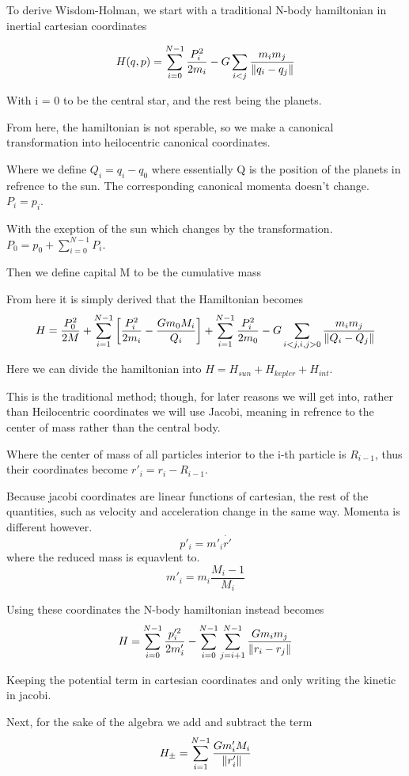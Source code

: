 To derive Wisdom-Holman, we start with a traditional N-body hamiltonian in inertial cartesian coordinates

\[
	H(q,p) = \sum_{i=0}^{N-1}\frac{P^2_i}
	{2m_i} - G \sum_{i<j} \frac{m_i m_j}{\norm{q_i - q_j}} \]

With i = 0 to be the central star, and the rest being the planets.

From here, the hamiltonian is not sperable, so we make a canonical transformation into heilocentric canonical coordinates.

Where we define $Q_i = q_i -q_0$ where essentially Q is the position of the planets in refrence to the sun. The corresponding canonical momenta doesn't change. $P_i=p_i$.

With the exeption of the sun which changes by the transformation. $P_0 = p_0 + \sum^{N-1}_{i=0} P_i$.

Then we define capital M to be the cumulative mass

From here it is simply derived that the Hamiltonian becomes
\[
	H = \frac{P_0^2}{2M} + \sum_{i=1}^{N-1} \left[\frac{P^2_i}{2m_i} - \frac{Gm_0 M_i}{Q_i}  \right] + \sum^{N-1}_{i=1} \frac{P^2_i}{2m_0} - G \sum_{i<j, i,j > 0} \frac{m_i m_j}{\norm{Q_i-Q_j}}
\]

Here we can divide the hamiltonian into $H = H_{sun} + H_{kepler} + H_{int}$.

This is the traditional method; though, for later reasons we will get into, rather than Heilocentric coordinates we will use Jacobi, meaning in refrence to the center of mass rather than the central body.

Where the center of mass of all particles interior to the i-th particle is $R_{i-1}$, thus their coordinates become $r'_i = r_i - R_{i-1}$.

Because jacobi coordinates are linear functions of cartesian, the rest of the quantities, such as velocity and acceleration change in the same way. Momenta is different however.
\[
	p'_i = m'_i \dot{r'}
\]
where the reduced mass is equavlent to.
\[
	m'_i = m_i \frac{M_i-1}{M_i}
\]



Using these coordinates the N-body hamiltonian instead becomes
\[
	H = \sum_{i=0}^{N-1}\frac{p'^2_i}{2m_i'} - \sum_{i=0}^{N-1} \sum_{j=i+1}^{N-1} \frac{G m_i m_j}{\norm{r_i - r_j}}
\]

Keeping the potential term in cartesian coordinates and only writing the kinetic in jacobi.

Next, for the sake of the algebra we add and subtract the term
\[
	H_{\pm} = \sum_{i=1}^{N-1} \frac{G m'_i M_i}{\norm{r'_i}}
\]

